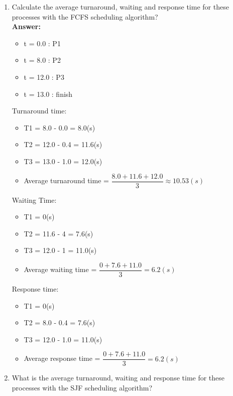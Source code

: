 \documentclass[a4paper]{article}
\newcommand{\tf}{\textbf}
\begin{document}
\begin{enumerate}[label=\alph*]
    \item Calculate the average turnaround, waiting and response time for these processes with the FCFS scheduling algorithm? \\
    
    \tf{Answer: } \\
    \begin{itemize}
        \item t = 0.0 : P1
        \item t = 8.0 : P2
        \item t = 12.0 : P3
        \item t = 13.0 : finish
    \end{itemize}

    \par{Turnaround time: } \\
    \begin{itemize}
        \item T1 = 8.0 - 0.0 = 8.0(s)
        \item T2 = 12.0 - 0.4 = 11.6(s)
        \item T3 = 13.0 - 1.0 = 12.0(s)
        \item Average turnaround time = $\dfrac{8.0 + 11.6 + 12.0}{3} \approx 10.53(s)$
    \end{itemize}

    \par{Waiting Time: } \\
    \begin{itemize}
        \item T1 = 0(s)
        \item T2 = 11.6 - 4 = 7.6(s)
        \item T3 = 12.0 - 1 = 11.0(s)
        \item Average waiting time = $\dfrac{0 + 7.6 + 11.0}{3} = 6.2(s)$
    \end{itemize}

    \par{Response time: }
    \begin{itemize}
        \item T1 = 0(s)
        \item T2 = 8.0 - 0.4 = 7.6(s)
        \item T3 = 12.0 - 1.0 = 11.0(s)
        \item Average response time = $\dfrac{0 + 7.6 + 11.0}{3} = 6.2(s)$
    \end{itemize}
    \item  What is the average turnaround, waiting and response time for these processes with the SJF scheduling algorithm? \\
    

\end{enumerate}
\end{document}
